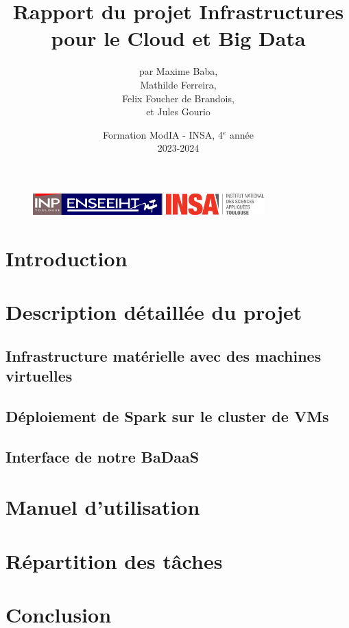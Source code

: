\documentclass[12pt,a4paper]{article}
\begin{document}
\begin{figure}[t]
    \centering
    \includegraphics[width=5cm]{src/inp_n7.png}
    \hfill
    \includegraphics[width=3.8cm]{src/insa_toulouse.png}
\end{figure}

\title{\vspace{4cm} \textbf{Rapport du projet Infrastructures pour le
Cloud et Big Data}}

\author{par Maxime Baba, \\
        Mathilde Ferreira, \\
        Felix Foucher de Brandois, \\
        et Jules Gourio}
        
\date{\vfill Formation ModIA - INSA, 4$^e$ année \\
2023-2024}

\maketitle

\newpage
\tableofcontents
\listoffigures

\newpage


\section{Introduction}


\section{Description détaillée du projet}

\subsection{Infrastructure matérielle avec des machines virtuelles}

\subsection{Déploiement de Spark sur le cluster de VMs}

\subsection{Interface de notre BaDaaS}




\section{Manuel d'utilisation}


\section{Répartition des tâches}


\section{Conclusion}
\end{document}
